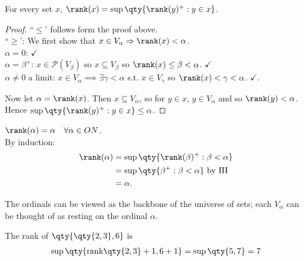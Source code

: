\begin{corollary}
    For every set $x$, $\rank(x) = \sup \qty{\rank(y)^+ : y \in x}$.
\end{corollary}

\begin{proof}
    ``$\leq$' follows form the proof above. \\
    ``$\geq$': We first show that $x \in V_\alpha \implies \rank(x) < \alpha$. \\
    $\alpha = 0$: $\checkmark$ \\
    $\alpha = \beta^+$: $x \in \mathcal{P}(V_\beta)$ so $x \subseteq V_\beta$ so $\rank(x) \leq \beta < \alpha$. $\checkmark$ \\
    $\alpha \neq 0$ a limit: $x \in V_\alpha \implies \exists \gamma < \alpha$ s.t. $x \in V_\gamma$ so $\rank(x) < \gamma < \alpha$. $\checkmark$.

    Now let $\alpha = \rank(x)$.
    Then $x \subseteq V_\alpha$, so for $y \in x$, $y \in V_\alpha$ and so $\rank(y) < \alpha$.
    Hence $\sup \qty{\rank(y)^+ : y \in x} \leq \alpha$.
\end{proof}

\begin{example}
    $\rank(\alpha) = \alpha \quad \forall \alpha \in ON$. \\
    By induction:
    \begin{align*}
        \rank(\alpha) &= \sup \qty{\rank(\beta)^+ : \beta < \alpha} \\
        &= \sup\qty{\beta^+ : \beta < \alpha} \text{ by IH} \\
        &= \alpha.
    \end{align*}
\end{example}

The ordinals can be viewed as the backbone of the universe of sets; each $V_\alpha$ can be thought of as resting on the ordinal $\alpha$.

\begin{example}
    The rank of $\qty{\qty{2, 3}, 6}$ is
    \begin{align*}
        \sup\qty{\mathrm{rank}\qty{2, 3} + 1, 6 + 1} = \sup\qty{5, 7} = 7
    \end{align*}
\end{example}